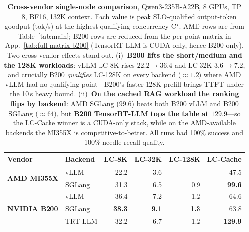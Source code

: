 \begin{table}[t]
  \centering
  \small
  \begin{tabular}{@{}l l r r r r@{}}
    \toprule
    \textbf{Vendor} & \textbf{Backend} & \textbf{LC-8K} & \textbf{LC-32K} &
    \textbf{LC-128K} & \textbf{LC-Cache} \\
    \midrule
    \multirow{2}{*}{\textbf{AMD MI355X}}
      & vLLM        & 22.2 & 3.6 & ---  & 47.5 \\
      & SGLang      & 31.3 & 6.5 & 0.9  & \textbf{99.6} \\
    \midrule
    \multirow{3}{*}{\textbf{NVIDIA B200}}
      & vLLM        & 36.4 & 7.2 & 1.2 & 64.6 \\
      & SGLang      & \textbf{38.3} & \textbf{9.1} & \textbf{1.3} & 63.8 \\
      & TRT-LLM     & 32.2 & 6.7 & 1.2 & \textbf{129.9} \\
    \bottomrule
  \end{tabular}
  \caption{\textbf{Cross-vendor single-node comparison}, Qwen3-235B-A22B, 8 GPUs,
  TP$=$8, BF16, 132K context. Each value is peak SLO-qualified output-token
  goodput (tok/s) at the highest qualifying concurrency C$^\star$. AMD rows are
  from Table~\ref{tab:main}; B200 rows are reduced from the per-point matrix in
  App.~\ref{tab:full-matrix-b200} (TensorRT-LLM is CUDA-only, hence B200-only).
  Two cross-vendor effects stand out. (i)~\textbf{B200 lifts the short/medium and
  the 128K workloads}: vLLM LC-8K rises $22.2\!\to\!36.4$ and LC-32K
  $3.6\!\to\!7.2$, and crucially B200 \emph{qualifies} LC-128K on every backend
  ($\approx1.2$) where AMD vLLM had no qualifying point---B200's faster 128K
  prefill brings TTFT under the 10\,s heavy bound. (ii)~\textbf{On the cached RAG
  workload the ranking flips by backend}: AMD SGLang ($99.6$) beats both B200
  vLLM and B200 SGLang ($\approx64$), but \textbf{B200 TensorRT-LLM tops the table
  at $129.9$}---so the LC-Cache winner is a CUDA-only stack, while on the
  AMD-available backends the MI355X is competitive-to-better. All runs had 100\%
  success and 100\% needle-recall quality.}
  \label{tab:b200}
\end{table}
